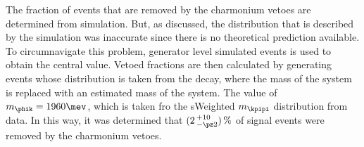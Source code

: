 The fraction of events that are removed by the charmonium vetoes are determined from simulation.
But, as discussed, the \qsq distribution that is described by the \btophikmumu simulation was
inaccurate since there is no theoretical prediction available.
To circumnavigate this problem, generator level simulated events is used to obtain the central
value.
Vetoed fractions are then calculated by generating events whose \qsq distribution is taken from the
 decay, where the mass of the  system is replaced with an
estimated mass of the \phik system.
The value of $m_{\phik}=1960\mev$, which is taken fro the sWeighted $m_{\kpipi}$ distribution from
data.
In this way, it was determined that $(2\,^{+10}_{-\pz2})\,\%$ of signal events were removed by the
charmonium vetoes.




%
%






